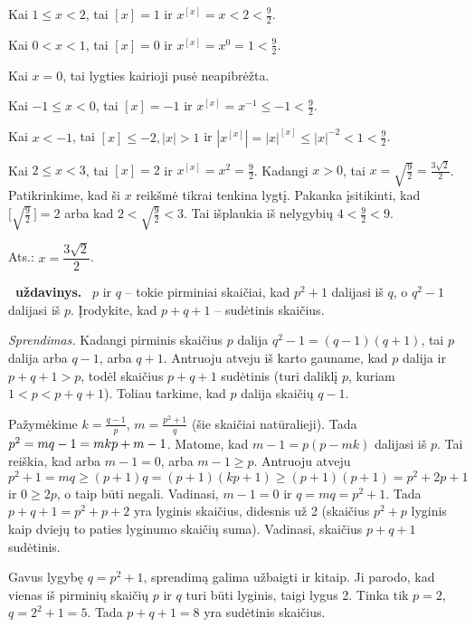 \documentclass[11pt,a4paper]{article}
\newcommand{\hm}[1]{\nobreak\hspace{0pt}#1\nobreak\hspace{0pt}}
\newcounter{uzdavinys}
\newenvironment{uzdavinys}
  {\refstepcounter{uzdavinys}\par\medskip\noindent\textbf{\theuzdavinys\ uždavinys.}\ }
  {\par\medskip}
\begin{document}
Kai $1\leq x<2$, tai $[x]=1$ ir $x^{[x]}=x<2<\frac{9}{2}$.

Kai $0<x<1$, tai $[x]=0$ ir $x^{[x]}=x^0=1<\frac{9}{2}$.

Kai $x=0$, tai lygties kairioji pusė neapibrėžta.

Kai $-1\leq x<0$, tai $[x]=-1$ ir $x^{[x]}=x^{-1}\leq -1<\frac{9}{2}$.

Kai $x<-1$, tai $[x]\leq -2, |x|>1$ ir $\left|x^{[x]}\right|=|x|^{[x]}\leq |x|^{-2}<1<\frac{9}{2}$.

Kai $2\leq x<3$, tai $[x]=2$ ir $x^{[x]}=x^2=\frac{9}{2}$. Kadangi $x>0$, tai $x=\sqrt{\frac{9}{2}}=\frac{3\sqrt{2}}{2}$. Patikrinkime, kad ši $x$ reikšmė tikrai tenkina lygtį. Pakanka įsitikinti, kad $\Big[\sqrt{\frac{9}{2}}\,\Big] =2$ arba kad $2<\sqrt{\frac{9}{2}}<3$. Tai išplaukia iš nelygybių $4<\frac{9}{2}<9$.
      \begin{flushright}
     Ats.: $x=\dfrac{3\sqrt{2}}{2}$.
    \end{flushright}
\vspace{3mm}

    
\begin{uzdavinys}
$p$ ir $q$ -- tokie pirminiai skaičiai, kad $p^2+1$ dalijasi iš $q$, o $q^2-1$ dalijasi iš $p$. Įrodykite, kad $p+q+1$ -- sudėtinis skaičius.
\end{uzdavinys}

\textit{Sprendimas.} 
Kadangi pirminis skaičius $p$ dalija $q^2-1=(q-1)(q+1)$, tai $p$ dalija arba $q-1$, arba $q+1$. Antruoju atveju iš karto gauname, kad $p$ dalija ir $p+q+1>p$, todėl skaičius $p+q+1$ sudėtinis (turi daliklį $p$, kuriam $1<p<p+q+1$). Toliau tarkime, kad $p$ dalija skaičių $q-1$.
    
Pažymėkime $k=\frac{q-1}p$, $m=\frac{p^2+1}{q}$ (šie skaičiai natūralieji). Tada $p^2=mq-1\hm=mkp+m-1$. Matome, kad $m-1=p(p-mk)$ dalijasi iš $p$. Tai reiškia, kad arba $m-1=0$, arba $m-1\geq p$. Antruoju atveju 
\[
p^2+1=mq\geq (p+1)q=(p+1)(kp+1)\geq (p+1)(p+1)=p^2+2p+1
\] 
ir $0\geq 2p$, o taip būti negali. Vadinasi, $m-1=0$ ir $q=mq=p^2+1$. Tada $p+q+1=p^2+p+2$ yra lyginis skaičius, didesnis už 2 (skaičius $p^2+p$ lyginis kaip dviejų to paties lyginumo skaičių suma). Vadinasi, skaičius $p+q+1$ sudėtinis. 

Gavus lygybę $q=p^2+1$, sprendimą galima užbaigti ir kitaip. Ji parodo, kad vienas iš pirminių skaičių $p$ ir $q$ turi būti lyginis, taigi lygus 2. Tinka tik $p=2$, $q=2^2+1=5$. Tada $p+q+1=8$ yra sudėtinis skaičius.



\vspace{0,7cm}
\end{document}
